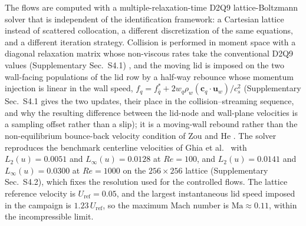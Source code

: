 \documentclass[11pt,a4paper]{article}
\newenvironment{chgadd}{\par\color{blue}}{\par\color{black}}
\begin{document}
\begin{chgadd}
The flows are computed with a multiple-relaxation-time D2Q9 lattice-Boltzmann
solver \cite{dhumieres2002mrt,chen1998doolen} that is independent of the
identification framework: a Cartesian lattice instead of scattered collocation, a
different discretization of the same equations, and a different iteration
strategy. Collision is performed in moment space with a diagonal relaxation
matrix whose non-viscous rates take the conventional D2Q9 values
(Supplementary Sec.~S4.1) \cite{lallemand2000theory}, and the moving lid is
imposed on the two wall-facing populations of the lid row by a half-way rebounce
whose momentum injection is linear in the wall speed, $f_q=f_{\bar q}^{*}+2w_q\rho_w(\mathbf{c}_q
\cdot\mathbf{u}_w)/c_s^2$ \cite{ladd1994} (Supplementary Sec.~S4.1 gives the two
updates, their place in the collision--streaming sequence, and why the resulting
difference between the lid-node and wall-plane velocities is a sampling offset rather
than a slip); it
is a moving-wall rebound rather than the non-equilibrium bounce-back velocity
condition of Zou and He \cite{zou1997pressure}. The solver reproduces the benchmark
centerline velocities of Ghia et al.~\cite{ghia1982high} with
$L_2(u)=0.0051$ and $L_\infty(u)=0.0128$ at $Re=100$, and
$L_2(u)=0.0141$ and $L_\infty(u)=0.0300$ at $Re=1000$ on the
$256\times256$ lattice (Supplementary Sec.~S4.2), which fixes the resolution used
for the controlled flows. The lattice reference velocity is
$U_{\mathrm{ref}}=0.05$, and the largest instantaneous lid speed imposed in the
campaign is $1.23\,U_{\mathrm{ref}}$, so the maximum Mach number is
$\mathrm{Ma}\approx0.11$, within the incompressible limit.


\end{chgadd}
\end{document}
